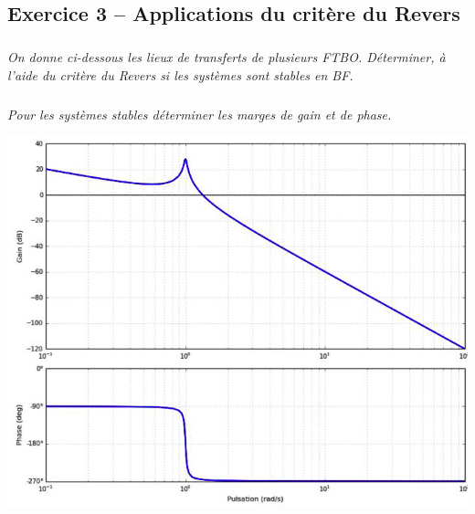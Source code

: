 \documentclass[10pt,fleqn]{article} %
\begin{document}
\begin{multicols}{2}
\subsection*{Exercice 3 -- Applications du critère du Revers}

\subparagraph*{}\textit{On donne ci-dessous les lieux de transferts de plusieurs FTBO. Déterminer, à l'aide du critère du Revers si les systèmes sont stables en BF.}
\subparagraph*{}\textit{Pour les systèmes stables déterminer les marges de gain et de phase.}

%
%
%

\begin{center}
\includegraphics[width=\linewidth]{images/OLD/fig_04}
\end{center}


\end{multicols}
\end{document}
